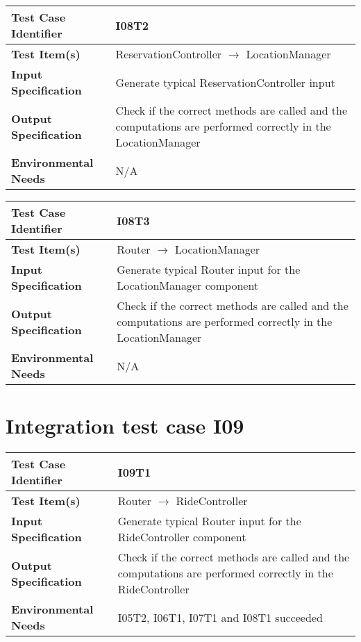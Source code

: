 \begin{center}
	\vspace{0.6cm}
	\begin{tabular}{|l|p{10cm}|}
		\hline
		\textbf{Test Case Identifier} & I08T2 \bigstrut \\\hline
		\textbf{Test Item(s)} & ReservationController \ensuremath{\rightarrow} LocationManager \bigstrut \\\hline
		\textbf{Input Specification} & Generate typical ReservationController input \bigstrut \\\hline
		\textbf{Output Specification} & Check if the correct methods are called and the computations are performed correctly in the LocationManager \bigstrut \\\hline
		\textbf{Environmental Needs} & N/A \bigstrut \\\hline
	\end{tabular}
\end{center}

\begin{center}
	\vspace{0.6cm}
	\begin{tabular}{|l|p{10cm}|}
		\hline
		\textbf{Test Case Identifier} & I08T3 \bigstrut \\\hline
		\textbf{Test Item(s)} & Router \ensuremath{\rightarrow} LocationManager \bigstrut \\\hline
		\textbf{Input Specification} & Generate typical Router input for the LocationManager component \bigstrut \\\hline
		\textbf{Output Specification} & Check if the correct methods are called and the computations are performed correctly in the LocationManager \bigstrut \\\hline
		\textbf{Environmental Needs} & N/A \bigstrut \\\hline
	\end{tabular}
\end{center}

\section{Integration test case I09}\label{I09}
\begin{center}
	\vspace{0.6cm}
	\begin{tabular}{|l|p{10cm}|}
		\hline
		\textbf{Test Case Identifier} & I09T1 \bigstrut \\\hline
		\textbf{Test Item(s)} & Router \ensuremath{\rightarrow} RideController \bigstrut \\\hline
		\textbf{Input Specification} & Generate typical Router input for the RideController component \bigstrut \\\hline
		\textbf{Output Specification} & Check if the correct methods are called and the computations are performed correctly in the RideController \bigstrut \\\hline
		\textbf{Environmental Needs} & I05T2, I06T1, I07T1 and I08T1 succeeded \bigstrut \\\hline
	\end{tabular}
\end{center}

